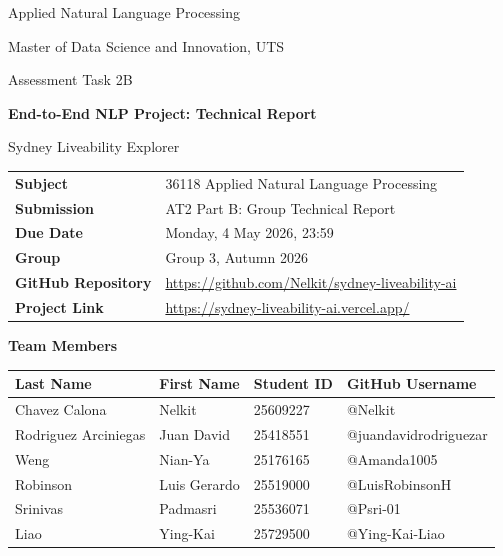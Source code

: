 \documentclass[11pt,a4paper]{article}
\newcommand{\subjectcode}{36118 Applied Natural Language Processing}
\newcommand{\course}{Master of Data Science and Innovation, UTS}
\newcommand{\assessment}{Assessment Task 2B}
\newcommand{\reporttitle}{End-to-End NLP Project: Technical Report}
\newcommand{\projectname}{Sydney Liveability Explorer}
\newcommand{\duedate}{Monday, 4 May 2026, 23:59}
\newcommand{\groupname}{Group 3, Autumn 2026}
\newcommand{\githublink}{\url{https://github.com/Nelkit/sydney-liveability-ai}}
\newcommand{\projectlink}{\url{https://sydney-liveability-ai.vercel.app/}}
\begin{document}
\raggedright

\begin{titlepage}
  \centering

  {\large\sffamily \subjectcode \par}
  \vspace{0.2cm}
  {\large\sffamily \course \par}
  \vspace{0.8cm}

  {\Large\sffamily \assessment \par}
  \vspace{0.4cm}
  {\LARGE\sffamily\bfseries \reporttitle \par}
  \vspace{0.3cm}
  {\Large\sffamily\color{primary} \projectname \par}

  \vspace{1.2cm}

  \begin{tabularx}{\textwidth}{>{\bfseries}lX}
    Subject & \subjectcode \\
    Submission & AT2 Part B: Group Technical Report \\
    Due Date & \duedate \\
    Group & \groupname \\
    GitHub Repository & \githublink \\
    Project Link & \projectlink \\
  \end{tabularx}

  \vspace{1.0cm}
  {\Large \textbf{Team Members} \par}
  \vspace{0.4cm}

  {\small
  \begin{longtable}{|l|l|l|l|}
    \hline
    \textbf{Last Name} & \textbf{First Name} & \textbf{Student ID} & \textbf{GitHub Username} \\
    \hline
    Chavez Calona & Nelkit & 25609227 & @Nelkit \\
    \hline
    Rodriguez Arciniegas & Juan David & 25418551 & @juandavidrodriguezar \\
    \hline
    Weng & Nian-Ya & 25176165 & @Amanda1005 \\
    \hline
    Robinson & Luis Gerardo & 25519000 & @LuisRobinsonH \\
    \hline
    Srinivas & Padmasri & 25536071 & @Psri-01 \\
    \hline
    Liao & Ying-Kai & 25729500 & @Ying-Kai-Liao \\
    \hline
  \end{longtable}}

  \vfill
\end{titlepage}
\end{document}
